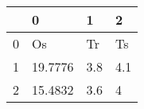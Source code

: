\begin{tabular}{llll}
\toprule
{} &        0 &    1 &    2 \\
\midrule
0 &       Os &   Tr &   Ts \\
1 &  19.7776 &  3.8 &  4.1 \\
2 &  15.4832 &  3.6 &    4 \\
\bottomrule
\end{tabular}
